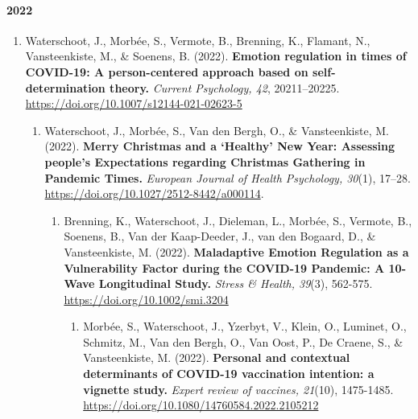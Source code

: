 \documentclass[
  twocolumn]{article}
\providecommand{\tightlist}{%
  \setlength{\itemsep}{0pt}\setlength{\parskip}{0pt}}
\begin{document}
\hypertarget{section-2}{%
\paragraph{2022}\label{section-2}}

\begin{enumerate}
\def\labelenumi{\arabic{enumi}.}
\setcounter{enumi}{20}
\tightlist
\item
  Waterschoot, J., Morbée, S., Vermote, B., Brenning, K., Flamant, N.,
  Vansteenkiste, M., \& Soenens, B. (2022). \textbf{Emotion regulation
  in times of COVID-19: A person-centered approach based on
  self-determination theory.} \emph{Current Psychology, 42},
  20211--20225. \url{https://doi.org/10.1007/s12144-021-02623-5}

  \begin{enumerate}
  \def\labelenumii{\arabic{enumii}.}
  \setcounter{enumii}{19}
  \tightlist
  \item
    Waterschoot, J., Morbée, S., Van den Bergh, O., \& Vansteenkiste, M.
    (2022). \textbf{Merry Christmas and a `Healthy' New Year: Assessing
    people's Expectations regarding Christmas Gathering in Pandemic
    Times.} \emph{European Journal of Health Psychology, 30}(1), 17--28.
    \url{https://doi.org/10.1027/2512-8442/a000114}.

    \begin{enumerate}
    \def\labelenumiii{\arabic{enumiii}.}
    \setcounter{enumiii}{18}
    \tightlist
    \item
      Brenning, K., Waterschoot, J., Dieleman, L., Morbée, S., Vermote,
      B., Soenens, B., Van der Kaap-Deeder, J., van den Bogaard, D., \&
      Vansteenkiste, M. (2022). \textbf{Maladaptive Emotion Regulation
      as a Vulnerability Factor during the COVID-19 Pandemic: A 10-Wave
      Longitudinal Study.} \emph{Stress \& Health, 39}(3), 562-575.
      \url{https://doi.org/10.1002/smi.3204}

      \begin{enumerate}
      \def\labelenumiv{\arabic{enumiv}.}
      \setcounter{enumiv}{17}
      \tightlist
      \item
        Morbée, S., Waterschoot, J., Yzerbyt, V., Klein, O., Luminet,
        O., Schmitz, M., Van den Bergh, O., Van Oost, P., De Craene, S.,
        \& Vansteenkiste, M. (2022). \textbf{Personal and contextual
        determinants of COVID-19 vaccination intention: a vignette
        study.} \emph{Expert review of vaccines, 21}(10), 1475-1485.
        \url{https://doi.org/10.1080/14760584.2022.2105212}


\end{enumerate}
\end{enumerate}
\end{enumerate}
\end{enumerate}
\end{document}

